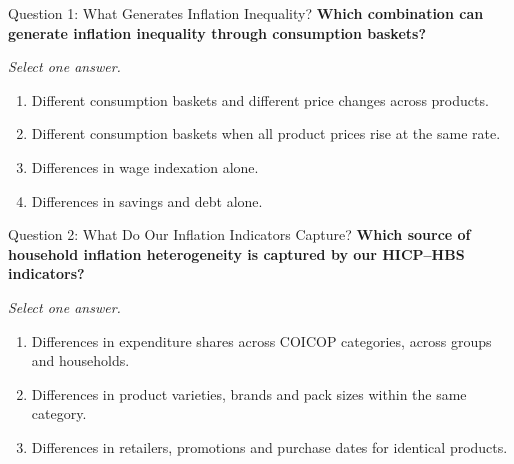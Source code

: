 \documentclass[11pt,aspectratio=169]{beamer}
\begin{document}

\begin{frame}{Question 1: What Generates Inflation Inequality?}
\textbf{Which combination can generate inflation inequality through consumption baskets?}
\par\vspace{.6em}
{\small\textit{Select one answer.}\par}
\vspace{.6em}
\begin{enumerate}
\item[A.] Different consumption baskets and different price changes across products.
\item[B.] Different consumption baskets when all product prices rise at the same rate.
\item[C.] Differences in wage indexation alone.
\item[D.] Differences in savings and debt alone.
\end{enumerate}
\end{frame}

\begin{frame}{Question 2: What Do Our Inflation Indicators Capture?}
\textbf{Which source of household inflation heterogeneity is captured by our HICP--HBS indicators?}
\par\vspace{.6em}
{\small\textit{Select one answer.}\par}
\vspace{.6em}
\begin{enumerate}
\item[A.] Differences in expenditure shares across COICOP categories, across groups and households.
\item[B.] Differences in product varieties, brands and pack sizes within the same category.
\item[C.] Differences in retailers, promotions and purchase dates for identical products.
\end{enumerate}
\end{frame}
\end{document}
